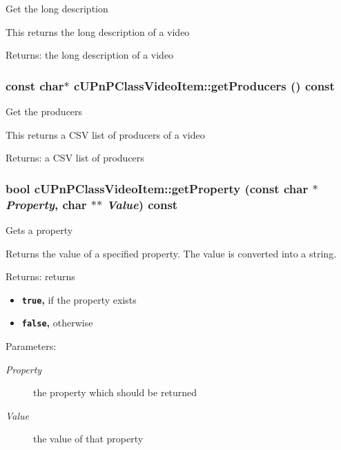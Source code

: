 Get the long description

This returns the long description of a video

\begin{Desc}
\item[Returns:]the long description of a video \end{Desc}
\hypertarget{classcUPnPClassVideoItem_bd72ad944de96ddc8795cfe531adfef1}{
\subsubsection[{getProducers}]{\setlength{\rightskip}{0pt plus 5cm}const char$\ast$ cUPnPClassVideoItem::getProducers () const}}
\label{classcUPnPClassVideoItem_bd72ad944de96ddc8795cfe531adfef1}


Get the producers

This returns a CSV list of producers of a video

\begin{Desc}
\item[Returns:]a CSV list of producers \end{Desc}
\hypertarget{classcUPnPClassVideoItem_94ab2ffcbe14abb63c680e6748e70ef1}{
\subsubsection[{getProperty}]{\setlength{\rightskip}{0pt plus 5cm}bool cUPnPClassVideoItem::getProperty (const char $\ast$ {\em Property}, \/  char $\ast$$\ast$ {\em Value}) const}}
\label{classcUPnPClassVideoItem_94ab2ffcbe14abb63c680e6748e70ef1}


Gets a property

Returns the value of a specified property. The value is converted into a string.

\begin{Desc}
\item[Returns:]returns\begin{itemize}
\item {\bf {\tt true},} if the property exists\item {\bf {\tt false},} otherwise \end{itemize}
\end{Desc}
\begin{Desc}
\item[Parameters:]
\begin{description}
\item[{\em Property}]the property which should be returned \item[{\em Value}]the value of that property \end{description}
\end{Desc}


